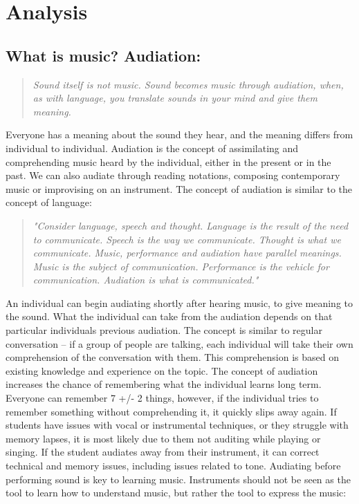 \chapter{Analysis}\label{chap:analysis}
\section{What is music? Audiation:} 
\begin{quote}
	\textit{Sound itself is not music. Sound becomes music through audiation, when, as with language, you translate sounds in your mind and give them meaning.}\\
\end{quote}

Everyone has a meaning about the sound they hear, and the meaning differs from individual to individual. Audiation is the concept of assimilating and comprehending music heard by the individual, either in the present or in the past. We can also audiate through reading notations, composing contemporary music or improvising on an instrument.
The concept of audiation is similar to the concept of language:\\

\begin{quote}
	\textit{"Consider language, speech and thought. Language is the result of the need to communicate. Speech is the way we communicate. Thought is what we communicate. Music, performance and audiation have parallel meanings. Music is the subject of communication. Performance is the vehicle for communication. Audiation is what is communicated."}\\
\end{quote}

An individual can begin audiating shortly after hearing music, to give meaning to the sound. What the individual can take from the audiation depends on that particular individuals previous audiation. The concept is similar to regular conversation – if a group of people are talking, each individual will take their own comprehension of the conversation with them. This comprehension is based on existing knowledge and experience on the topic. 
The concept of audiation increases the chance of remembering what the individual learns long term. Everyone can remember 7 +/- 2 things, however, if the individual tries to remember something without comprehending it, it quickly slips away again. If students have issues with vocal or instrumental techniques, or they struggle with memory lapses, it is most likely due to them not auditing while playing or singing. If the student audiates away from their instrument, it can correct technical and memory issues, including issues related to tone. Audiating before performing sound is key to learning music. Instruments should not be seen as the tool to learn how to understand music, but rather the tool to express the music:\\

